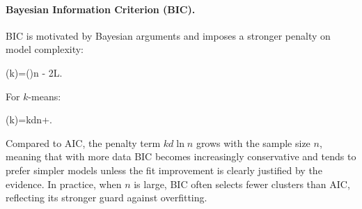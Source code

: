 \paragraph{Bayesian Information Criterion (BIC).}
BIC is motivated by Bayesian arguments and imposes a stronger penalty on model
complexity:
\begin{myequation}
(k)=()\cdot \ln n - 2\ln L.
\end{myequation}
For $k$-means:
\begin{myequation}
(k)=kd\cdot \ln n+.
\end{myequation}
Compared to AIC, the penalty term $kd\ln n$ grows with the sample size $n$, meaning that
with more data BIC becomes increasingly conservative and tends to prefer simpler models
unless the fit improvement is clearly justified by the evidence. In practice, when
$n$ is large, BIC often selects fewer clusters than AIC, reflecting its stronger guard against
overfitting.

